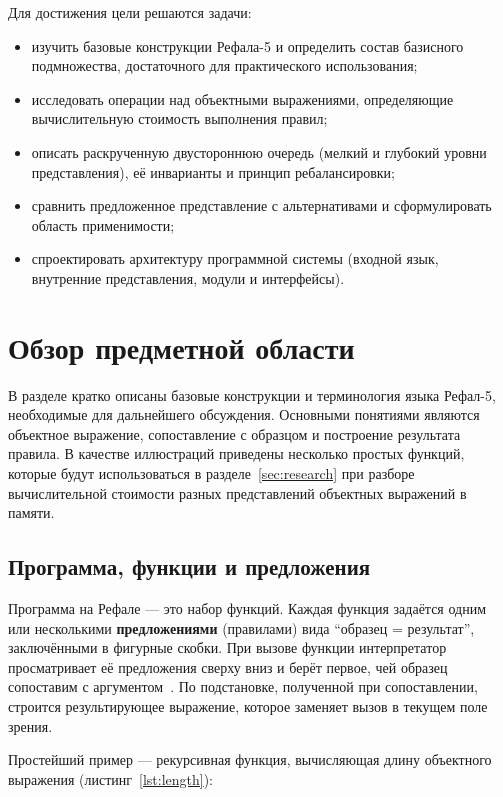 \documentclass[14pt, russian]{scrartcl}
\newcommand{\enq}[1]{\enquote{#1}}
\begin{document}
Для достижения цели решаются задачи:
\begin{itemize}
  \item изучить базовые конструкции Рефала-5 и определить состав базисного подмножества, достаточного для практического использования;
  \item исследовать операции над объектными выражениями, определяющие вычислительную стоимость выполнения правил;
  \item описать раскрученную двустороннюю очередь (мелкий и глубокий уровни представления), её инварианты и принцип ребалансировки;
  \item сравнить предложенное представление с альтернативами и сформулировать область применимости;
  \item спроектировать архитектуру программной системы (входной язык, внутренние представления, модули и интерфейсы).
\end{itemize}

\section{Обзор предметной области}

В разделе кратко описаны базовые конструкции и терминология языка Рефал-5,
необходимые для дальнейшего обсуждения. Основными понятиями являются
объектное выражение, сопоставление с образцом и построение результата правила.
В качестве иллюстраций приведены несколько простых функций, которые будут
использоваться в разделе~\ref{sec:research} при разборе вычислительной стоимости
разных представлений объектных выражений в памяти.

\subsection{Программа, функции и предложения}
\label{sec:refal-program}

Программа на Рефале --- это набор функций. Каждая функция задаётся одним или
несколькими \textbf{предложениями} (правилами) вида \enq{образец = результат},
заключёнными в фигурные скобки. При вызове функции интерпретатор просматривает
её предложения сверху вниз и берёт первое, чей образец сопоставим с
аргументом~\cite{refal_book,refal05_site}. По подстановке, полученной при
сопоставлении, строится результирующее выражение, которое заменяет вызов в
текущем поле зрения.

Простейший пример --- рекурсивная функция, вычисляющая длину объектного
выражения (листинг~\ref{lst:length}):
\end{document}
